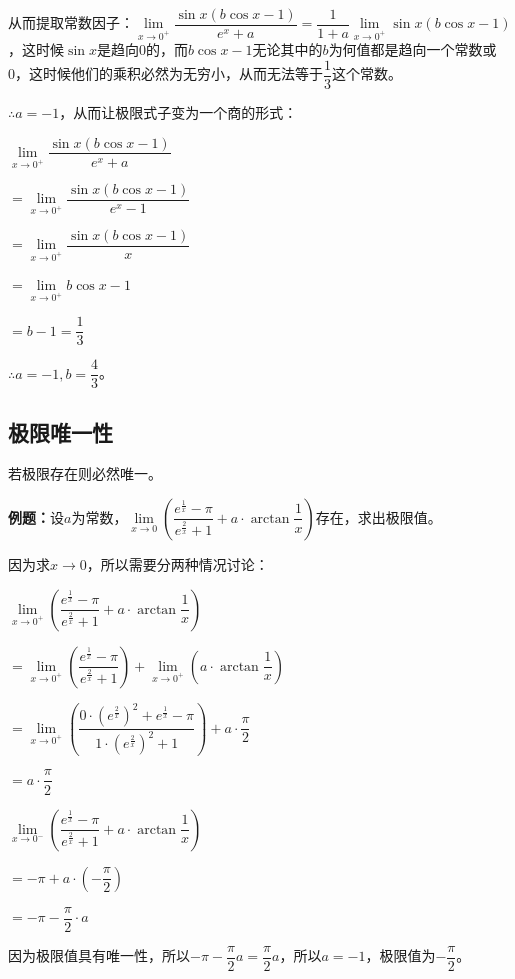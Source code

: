 从而提取常数因子：$\lim\limits_{x\to 0^+}\dfrac{\sin x(b\cos x-1)}{e^x+a}=\dfrac{1}{1+a}\lim\limits_{x\to 0^+}\sin x(b\cos x-1)$，这时候$\sin x$是趋向0的，而$b\cos x-1$无论其中的$b$为何值都是趋向一个常数或0，这时候他们的乘积必然为无穷小，从而无法等于$\dfrac{1}{3}$这个常数。

$\therefore a=-1$，从而让极限式子变为一个商的形式：\medskip

$\lim\limits_{x\to 0^+}\dfrac{\sin x(b\cos x-1)}{e^x+a}$\medskip

$=\lim\limits_{x\to 0^+}\dfrac{\sin x(b\cos x-1)}{e^x-1}$\medskip

$=\lim\limits_{x\to 0^+}\dfrac{\sin x(b\cos x-1)}{x}$\medskip

$=\lim\limits_{x\to 0^+}b\cos x-1$\medskip

$=b-1=\dfrac{1}{3}$\medskip

$\therefore a=-1,b=\dfrac{4}{3}$。

\subsection{极限唯一性}

若极限存在则必然唯一。

\textbf{例题：}设$a$为常数，$\lim\limits_{x\to 0}\left(\dfrac{e^{\frac{1}{x}}-\pi}{e^{\frac{2}{x}}+1}+a\cdot\arctan\dfrac{1}{x}\right)$存在，求出极限值。

因为求$x\to 0$，所以需要分两种情况讨论：

\medskip

$\lim\limits_{x\to 0^+}\left(\dfrac{e^{\frac{1}{x}}-\pi}{e^{\frac{2}{x}}+1}+a\cdot\arctan\dfrac{1}{x}\right)$

$= \lim\limits_{x\to 0^+}\left(\dfrac{e^{\frac{1}{x}}-\pi}{e^{\frac{2}{x}}+1}\right)+\lim\limits_{x\to 0^+}\left(a\cdot\arctan\dfrac{1}{x}\right)$

$= \lim\limits_{x\to 0^+}\left(\dfrac{0\cdot\left(e^{\frac{2}{x}}\right)^2+e^{\frac{1}{x}}-\pi}{1\cdot\left(e^{\frac{2}{x}}\right)^2+1}\right)+a\cdot\dfrac{\pi}{2}$

$= a\cdot\dfrac{\pi}{2}$

\medskip

$\lim\limits_{x\to 0^-}\left(\dfrac{e^{\frac{1}{x}}-\pi}{e^{\frac{2}{x}}+1}+a\cdot\arctan\dfrac{1}{x}\right)$

$= -\pi+a\cdot\left(-\dfrac{\pi}{2}\right)$

$= -\pi-\dfrac{\pi}{2}\cdot a$

因为极限值具有唯一性，所以$-\pi-\dfrac{\pi}{2}a=\dfrac{\pi}{2}a$，所以$a=-1$，极限值为$-\dfrac{\pi}{2}$。

